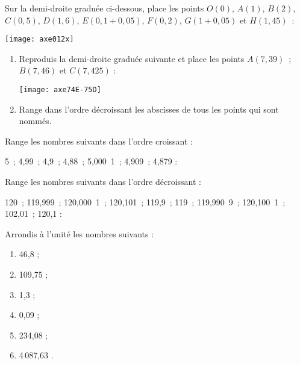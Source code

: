 \begin{exercice}
Sur la demi-droite graduée ci-dessous, place les points $O(0)$, $A(1)$, $B(2)$, $C(0,5)$, $D(1,6)$, $E(0,1 + 0,05)$, $F(0,2)$, $G(1 + 0,05)$ et $H(1,45)$ :
\begin{center} \texttt{[image: axe012x]} \end{center}
\end{exercice}



\begin{exercice}
\begin{enumerate}
 \item Reproduis la demi-droite graduée suivante et place les points $A(7,39)$ ; $B(7,46)$ et $C(7,425)$ :
\begin{center} \texttt{[image: axe74E-75D]} \end{center}
 \item Range dans l'ordre décroissant les abscisses de tous les points qui sont nommés.
 \end{enumerate}
\end{exercice}


\begin{exercice}[Rangement]
Range les nombres suivants dans l'ordre croissant :

5 ; 4,99 ; 4,9 ; 4,88 ; 5,000 1 ; 4,909 ; 4,879 :

\dotfill

\dotfill
\end{exercice}


\begin{exercice}
Range les nombres suivants dans l'ordre décroissant :

120 ; 119,999 ; 120,000 1 ; 120,101 ; 119,9 ; 119 ; 119,990 9 ; 120,100 1 ; 102,01 ; 120,1 :

\dotfill

\dotfill
\end{exercice}



\begin{exercice}
Arrondis à l'unité les nombres suivants :
\begin{enumerate}
 \item 46,8 \dotfill ; 
 
 \item 109,75 \dotfill ; 
 
 \item 1,3 \dotfill ; 
 
 \item 0,09 \dotfill ; 
 
 \item 234,08 \dotfill ; 
 
 \item 4\,087,63 \dotfill. 
 
 \end{enumerate}
\end{exercice}

